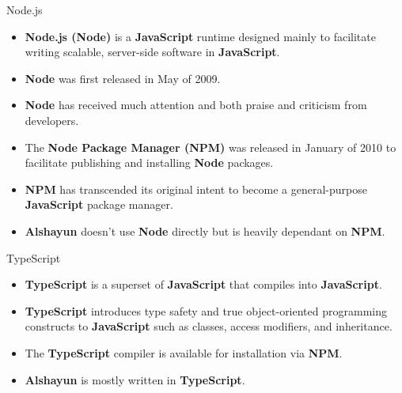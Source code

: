 \documentclass{beamer}
\begin{document}
\begin{frame}{Node.js}
    \begin{itemize}
        \item \textbf{Node.js (Node)} is a \textbf{JavaScript} runtime designed
            mainly to facilitate writing scalable, server-side software in
            \textbf{JavaScript}.
        \item \textbf{Node} was first released in May of 2009.
        \item \textbf{Node} has received much attention and both praise and
            criticism from developers.
        \item The \textbf{Node Package Manager (NPM)} was released in January of
            2010 to facilitate publishing and installing \textbf{Node} packages.
        \item \textbf{NPM} has transcended its original intent to become a
            general-purpose \textbf{JavaScript} package manager.
        \item \textbf{Alshayun} doesn't use \textbf{Node} directly but is
            heavily dependant on \textbf{NPM}.
    \end{itemize}
\end{frame}

\begin{frame}{TypeScript}
    \begin{itemize}
        \item \textbf{TypeScript} is a superset of \textbf{JavaScript} that
            compiles into \textbf{JavaScript}.
        \item \textbf{TypeScript} introduces type safety and true
            object-oriented programming constructs to \textbf{JavaScript} such
            as classes, access modifiers, and inheritance.
        \item The \textbf{TypeScript} compiler is available for installation via
            \textbf{NPM}.
        \item \textbf{Alshayun} is mostly written in \textbf{TypeScript}.
    \end{itemize}
\end{frame}
\end{document}
